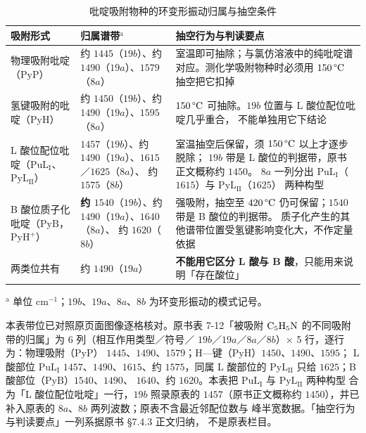 \begin{table}[htbp]
\centering
\caption{吡啶吸附物种的环变形振动归属与抽空条件}
\label{tab:ch07b-py}
\small
\begin{tabularx}{\onecolwidth}{@{}>{\raggedright\arraybackslash}p{26mm}
 >{\raggedright\arraybackslash}p{34mm}
 >{\raggedright\arraybackslash}X@{}}
\toprule
吸附形式 & 归属谱带$^{\mathrm{a}}$ & 抽空行为与判读要点 \\
\midrule
物理吸附吡啶（$\mathrm{PyP}$） &
 约 $1445$（$19b$）、约 $1490$（$19a$）、$1579$（$8a$） &
 室温即可抽除；与氯仿溶液中的纯吡啶谱对应。测化学吸附物种时必须用
 $150\,\degC$ 抽空把它扣掉 \\
氢键吸附的吡啶（$\mathrm{PyH}$） &
 约 $1450$（$19b$）、约 $1490$（$19a$）、$1595$（$8a$） &
 $150\,\degC$ 可抽除。$19b$ 位置与 L 酸位配位吡啶几乎重合，
 不能单独用它下结论 \\
L 酸位配位吡啶（$\mathrm{PuL_{I}}$、$\mathrm{PyL_{II}}$） &
 \textbf{$1457$}（$19b$）、约 $1490$（$19a$）、$1615$／$1625$（$8a$）、
 约 $1575$（$8b$） &
 室温抽空后保留，须 $150\,\degC$ 以上才逐步脱除；
 $19b$ 带是 L 酸位的判据带，原书正文概称约 $1450$。
 $8a$ 一列分出 $\mathrm{PuL_{I}}$（$1615$）与 $\mathrm{PyL_{II}}$（$1625$）
 两种构型 \\
B 酸位质子化吡啶（$\mathrm{PyB}$，$\mathrm{PyH^{+}}$） &
 \textbf{约 $1540$}（$19b$）、约 $1490$（$19a$）、$1640$（$8a$）、
 约 $1620$（$8b$） &
 强吸附，抽空至 $420\,\degC$ 仍可保留；$1540$ 带是 B 酸位的判据带。
 质子化产生的其他谱带位置受氢键影响变化大，不作定量依据 \\
两类位共有 &
 约 $1490$（$19a$） &
 \textbf{不能用它区分 L 酸与 B 酸}，只能用来说明「存在酸位」 \\
\bottomrule
\end{tabularx}

\vspace{1pt}
{\srcsize $^{\mathrm{a}}$ 单位 $\mathrm{cm^{-1}}$；$19b$、$19a$、$8a$、$8b$
为环变形振动的模式记号。}

\vspace{2pt}
{\srcsize 本表带位已对照原页面图像逐格核对。原书表 7-12「被吸附
$\ce{C5H5N}$ 的不同吸附带的归属」为 6 列（相互作用类型／符号／
$19b$／$19a$／$8a$／$8b$）× 5 行，逐行为：物理吸附（$\mathrm{PyP}$）
$1445$、$1490$、$1579$；H—键（$\mathrm{PyH}$）$1450$、$1490$、$1595$；
L 酸部位 $\mathrm{PuL_{I}}$ $1457$、$1490$、$1615$、约 $1575$，同属 L 酸部位的
$\mathrm{PyL_{II}}$ 只给 $1625$；B 酸部位（$\mathrm{PyB}$）$1540$、$1490$、
$1640$、约 $1620$。本表把 $\mathrm{PuL_{I}}$ 与 $\mathrm{PyL_{II}}$ 两种构型
合为「L 酸位配位吡啶」一行，$19b$ 照录原表的 $1457$（原书正文概称约
$1450$），并已补入原表的 $8a$、$8b$ 两列波数；原表不含最近邻配位数与
峰半宽数据。「抽空行为与判读要点」一列系据原书 §7.4.3 正文归纳，
不是原表栏目。}
\end{table}

